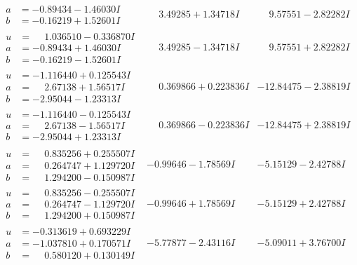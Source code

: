 \documentclass[1p]{elsarticle_modified}
\theoremstyle{definition}
\begin{document}
$$\begin{array}{c|c|c}
\begin{aligned}
a &= -0.89434 - 1.46030 I \\
b &= -0.16219 + 1.52601 I\end{aligned}
 & \phantom{-}3.49285 + 1.34718 I & \phantom{-}9.57551 - 2.82282 I \\ \hline\begin{aligned}
u &= \phantom{-}1.036510 - 0.336870 I \\
a &= -0.89434 + 1.46030 I \\
b &= -0.16219 - 1.52601 I\end{aligned}
 & \phantom{-}3.49285 - 1.34718 I & \phantom{-}9.57551 + 2.82282 I \\ \hline\begin{aligned}
u &= -1.116440 + 0.125543 I \\
a &= \phantom{-}2.67138 + 1.56517 I \\
b &= -2.95044 - 1.23313 I\end{aligned}
 & \phantom{-}0.369866 + 0.223836 I & -12.84475 - 2.38819 I \\ \hline\begin{aligned}
u &= -1.116440 - 0.125543 I \\
a &= \phantom{-}2.67138 - 1.56517 I \\
b &= -2.95044 + 1.23313 I\end{aligned}
 & \phantom{-}0.369866 - 0.223836 I & -12.84475 + 2.38819 I \\ \hline\begin{aligned}
u &= \phantom{-}0.835256 + 0.255507 I \\
a &= \phantom{-}0.264747 + 1.129720 I \\
b &= \phantom{-}1.294200 - 0.150987 I\end{aligned}
 & -0.99646 - 1.78569 I & -5.15129 - 2.42788 I \\ \hline\begin{aligned}
u &= \phantom{-}0.835256 - 0.255507 I \\
a &= \phantom{-}0.264747 - 1.129720 I \\
b &= \phantom{-}1.294200 + 0.150987 I\end{aligned}
 & -0.99646 + 1.78569 I & -5.15129 + 2.42788 I \\ \hline\begin{aligned}
u &= -0.313619 + 0.693229 I \\
a &= -1.037810 + 0.170571 I \\
b &= \phantom{-}0.580120 + 0.130149 I\end{aligned}
 & -5.77877 - 2.43116 I & -5.09011 + 3.76700 I \\ \hline\begin{aligned}

\end{aligned}
\end{array}$$
\end{document}
